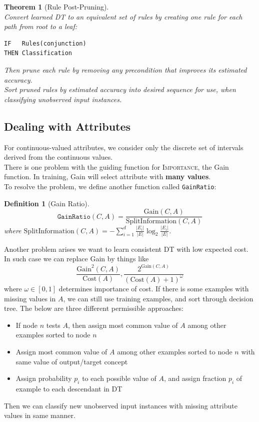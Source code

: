 \documentclass[12pt]{article}
\newtheorem{definition}{Definition}[section]
\newtheorem{theorem}{Theorem}[section]
\theoremstyle{definition}
\begin{document}
\begin{theorem}[Rule Post-Pruning]
\hfill\\\normalfont Convert learned DT to an equivalent set of rules by creating one rule for each path from root to a leaf:
\begin{verbatim}
IF   Rules(conjunction)
THEN Classification
\end{verbatim}
Then prune each rule by removing any precondition that improves its estimated accuracy.\\
Sort pruned rules by estimated accuracy into desired sequence for use, when classifying unobserved input instances.
\end{theorem}
\subsection{Dealing with Attributes}
For continuous-valued attributes, we consider only the discrete set of intervals derived from the continuous values.\\
There is one problem with the guiding function for \textsc{Importance}, the Gain function. In training, Gain will select attribute with \textbf{many values}.\\
To resolve the problem, we define another function called \texttt{GainRatio}:
\begin{definition}[Gain Ratio]
\hfill\\\normalfont 
\[
\texttt{GainRatio}(C,A)= \frac{\mathrm{Gain}(C,A)}{\mathrm{SplitInformation}(C,A)}
\]
where $\mathrm{SplitInformation}(C,A)=-\sum_{i=1}^d\frac{|E_i|}{|E|}\log_2\frac{|E_i|}{|E|}$.
\end{definition}
Another problem arises we want to learn consistent DT with low expected cost. In such case we can replace Gain by things like
\[
\frac{\mathrm{Gain}^2(C,A)}{\mathrm{Cost}(A)}, \frac{2^{\mathrm{Gain}(C,A)}}{(\mathrm{Cost}(A)+1)^\omega}
\]
where $\omega\in[0,1]$ determines importance of cost.
If there is some examples with missing values in $A$, we can still use training examples, and sort through decision tree. The below are three different permissible approaches:
\begin{itemize}
	\item If node $n$ tests $A$, then assign most common value of $A$ among other examples sorted to node $n$
	\item Assign most common value of $A$ among other examples sorted to node $n$ with same value of output/target concept
	\item Assign probability $p_i$ to each possible value of $A$, and assign fraction $p_i$ of example to each descendant in DT
\end{itemize}
Then we can classify new unobserved input instances with missing attribute values in same manner.
\clearpage
\end{document}
